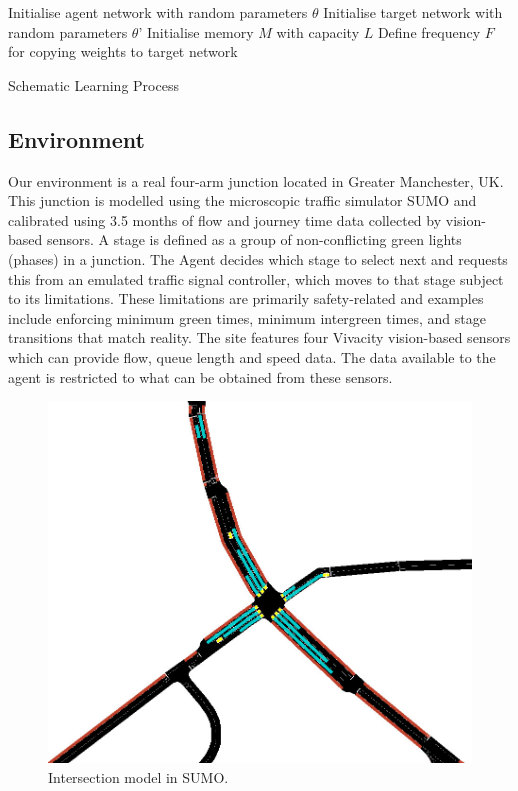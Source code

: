 \documentclass{article}
\begin{document}
\begin{algorithm}
\SetAlgoLined
 Initialise agent network with random parameters $\theta$\;
 Initialise target network with random parameters $\theta$'\;
 Initialise memory $M$ with capacity $L$\;
 Define frequency $F$ for copying weights to target network\;
 \caption{Schematic Learning Process}
\end{algorithm}
\subsection{Environment}

Our environment is a real four-arm junction located in Greater Manchester, UK.
This junction is modelled using the microscopic traffic simulator SUMO \cite{sumo} and calibrated using 3.5 months of flow and journey time data collected by vision-based sensors.
A stage is defined as a group of non-conflicting green lights (phases) in a junction.
The Agent decides which stage to select next and requests this from an emulated traffic signal controller, which moves to that stage subject to its limitations. These limitations are primarily safety-related and examples include enforcing minimum green times, minimum intergreen times, and stage transitions that match reality.
The site features four Vivacity vision-based sensors which can provide flow, queue length and speed data. The data available to the agent is restricted to what can be obtained from these sensors.

\begin{figure}[thpb]
    \centering
    \includegraphics[width=.5\linewidth]{figures/intersection.png}
    \caption{Intersection model in SUMO.}
    \label{fig:intersection}
\end{figure}
\end{document}
